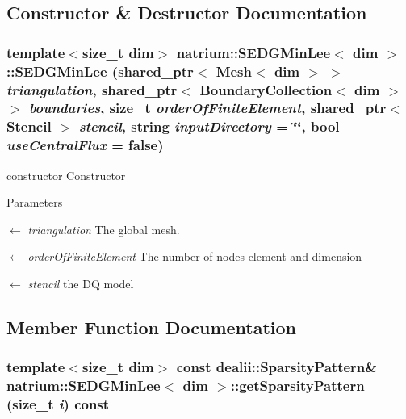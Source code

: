 \subsection{Constructor \& Destructor Documentation}
\hypertarget{classnatrium_1_1SEDGMinLee_a6010ff397c7ea56751187084ad6e7ed0}{
\subsubsection[{SEDGMinLee}]{\setlength{\rightskip}{0pt plus 5cm}template$<$size\_\-t dim$>$ {\bf natrium::SEDGMinLee}$<$ dim $>$::{\bf SEDGMinLee} (shared\_\-ptr$<$ Mesh$<$ dim $>$ $>$ {\em triangulation}, \/  shared\_\-ptr$<$ {\bf BoundaryCollection}$<$ dim $>$ $>$ {\em boundaries}, \/  size\_\-t {\em orderOfFiniteElement}, \/  shared\_\-ptr$<$ {\bf Stencil} $>$ {\em stencil}, \/  string {\em inputDirectory} = {\ttfamily \char`\"{}\char`\"{}}, \/  bool {\em useCentralFlux} = {\ttfamily false})}}
\label{classnatrium_1_1SEDGMinLee_a6010ff397c7ea56751187084ad6e7ed0}


constructor Constructor 
\begin{DoxyParams}{Parameters}
\item[\mbox{$\leftarrow$} {\em triangulation}]The global mesh. \item[\mbox{$\leftarrow$} {\em orderOfFiniteElement}]The number of nodes element and dimension \item[\mbox{$\leftarrow$} {\em stencil}]the DQ model \end{DoxyParams}


\subsection{Member Function Documentation}
\hypertarget{classnatrium_1_1SEDGMinLee_ac9392932aaab8186b427b9d12bc64771}{
\subsubsection[{getSparsityPattern}]{\setlength{\rightskip}{0pt plus 5cm}template$<$size\_\-t dim$>$ const dealii::SparsityPattern\& {\bf natrium::SEDGMinLee}$<$ dim $>$::getSparsityPattern (size\_\-t {\em i}) const}}
\label{classnatrium_1_1SEDGMinLee_ac9392932aaab8186b427b9d12bc64771}


